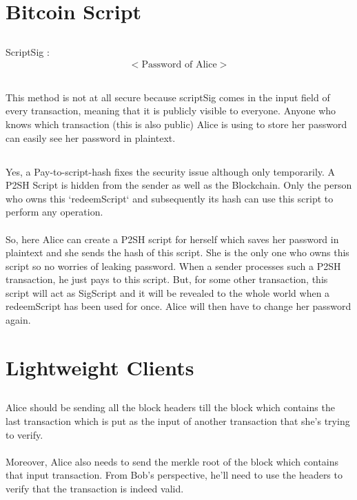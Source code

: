 \documentclass[12pt, a4paper]{article}
\begin{document}
\section{Bitcoin Script}
\subsection{}
ScriptSig :
\begin{align*}
	<\text{Password of Alice}>
\end{align*}
\subsection{}
	This method is not at all secure because scriptSig comes in the input field of every transaction, meaning that it is publicly visible to everyone. Anyone who knows which transaction (this is also public) Alice is using to store her password can easily see her password in plaintext.
\subsection{}
Yes, a Pay-to-script-hash fixes the security issue although only temporarily. A P2SH Script is hidden from the sender as well as the Blockchain. Only the person who owns this `redeemScript` and subsequently its hash can use this script to perform any operation.  \\  \\
So, here Alice can create a P2SH script for herself which saves her password in plaintext and she sends the hash of this script. She is the only one who owns this script so no worries of leaking password. When a sender processes such a P2SH transaction, he just pays to this script. But, for some other transaction, this script will act as SigScript and it will be revealed to the whole world when a redeemScript has been used for once. Alice will then have to change her password again. 

\section{Lightweight Clients}
\subsection{}
Alice should be sending all the block headers till the block which contains the last transaction which is put as the input of another transaction that she's trying to verify. 
\\ \\
Moreover, Alice also needs to send the merkle root of the block which contains that input transaction. From Bob's perspective, he'll need to use the headers to verify that the transaction is indeed valid.
\end{document}
